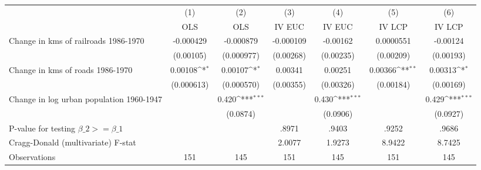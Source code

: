 {
\def\sym#1{\ifmmode^{#1}\else\(^{#1}\)\fi}
\begin{tabular}{l*{6}{c}}
\hline\hline
                &\multicolumn{1}{c}{(1)}&\multicolumn{1}{c}{(2)}&\multicolumn{1}{c}{(3)}&\multicolumn{1}{c}{(4)}&\multicolumn{1}{c}{(5)}&\multicolumn{1}{c}{(6)}\\
                &\multicolumn{1}{c}{OLS}&\multicolumn{1}{c}{OLS}&\multicolumn{1}{c}{IV EUC}&\multicolumn{1}{c}{IV EUC}&\multicolumn{1}{c}{IV LCP}&\multicolumn{1}{c}{IV LCP}\\
\hline
Change in kms of railroads 1986-1970&-0.000429         &-0.000879         &-0.000109         & -0.00162         &0.0000551         & -0.00124         \\
                &(0.00105)         &(0.000977)         &(0.00268)         &(0.00235)         &(0.00209)         &(0.00193)         \\
[1em]
Change in kms of roads 1986-1970&  0.00108\sym{*}  &  0.00107\sym{*}  &  0.00341         &  0.00251         &  0.00366\sym{**} &  0.00313\sym{*}  \\
                &(0.000613)         &(0.000570)         &(0.00355)         &(0.00326)         &(0.00184)         &(0.00169)         \\
[1em]
Change in log urban population 1960-1947&                  &    0.420\sym{***}&                  &    0.430\sym{***}&                  &    0.429\sym{***}\\
                &                  & (0.0874)         &                  & (0.0906)         &                  & (0.0927)         \\
\hline
P-value for testing $\beta\_{2} >= \beta\_{1}$&                  &                  &    .8971         &    .9403         &    .9252         &    .9686         \\
Cragg-Donald (multivariate) F-stat&                  &                  &   2.0077         &   1.9273         &   8.9422         &   8.7425         \\
Observations    &      151         &      145         &      151         &      145         &      151         &      145         \\
\hline\hline
\end{tabular}
}
